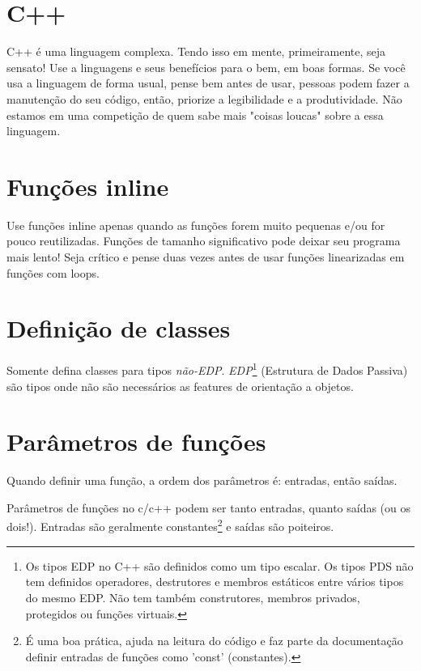 \documentclass{article}
\begin{document}
\section{C++}

C++ é uma linguagem complexa. Tendo isso em mente, primeiramente, seja sensato! Use a linguagens e seus benefícios para o bem, em boas formas. Se você usa a linguagem de forma usual, pense bem antes de usar, pessoas podem fazer a manutenção do seu código, então, priorize a legibilidade e a produtividade. Não estamos em uma competição de quem sabe mais "coisas loucas" sobre a essa linguagem.

\section{Funções inline}

Use funções inline apenas quando as funções forem muito pequenas e/ou for pouco reutilizadas. Funções de tamanho significativo pode deixar seu programa mais lento! Seja crítico e pense duas vezes antes de usar funções linearizadas em funções com loops.

\section{Definição de classes}

Somente defina classes para tipos \emph{não-EDP}. \emph{EDP}\footnote{Os tipos EDP no C++ são definidos como um tipo escalar. Os tipos PDS não tem definidos operadores, destrutores e membros estáticos entre vários tipos do mesmo EDP. Não tem também construtores, membros privados, protegidos ou funções virtuais.} (Estrutura de Dados Passiva) são tipos onde não são necessários as features de orientação a objetos.

\section{Parâmetros de funções}

Quando definir uma função, a ordem dos parâmetros é: entradas, então saídas.

Parâmetros de funções no c/c++ podem ser tanto entradas, quanto saídas (ou os dois!). Entradas são geralmente constantes\footnote{É uma boa prática, ajuda na leitura do código e faz parte da documentação definir entradas de funções como 'const' (constantes).} e saídas são poiteiros. 
\end{document}
